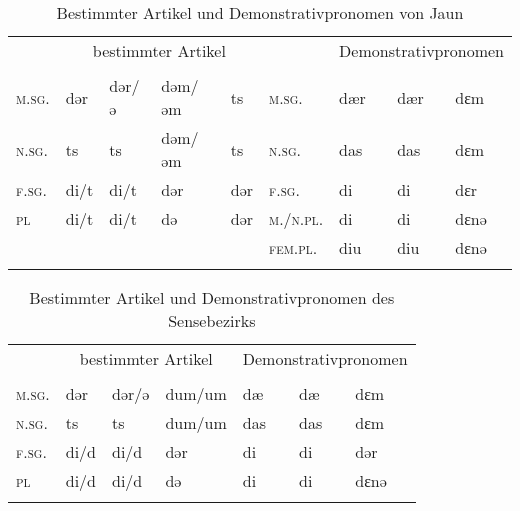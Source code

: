 \begin{table}[H]
	\caption{Bestimmter Artikel und Demonstrativpronomen von Jaun \citep[282-283]{Stucki1917}}\label{table86}
	\begin{tabular}{lllllllll}
		\lsptoprule
		& \multicolumn{4}{c}{bestimmter Artikel} &  & \multicolumn{3}{c}{Demonstrativpronomen}\\\cmidrule(lr){2-5}\cmidrule(lr){7-9}
		& \NOM & \AKK & \DAT & \GEN &  & \NOM & \AKK & \DAT\\\midrule
		\textsc{m.sg.} & dər & dər/ə & dəm/əm & ts & \textsc{m.sg.} & dær & dær & dɛm\\
		\textsc{n.sg.} & ts & ts & dəm/əm & ts & \textsc{n.sg.} & das & das & dɛm\\
		\textsc{f.sg.} & di/t & di/t & dər & dər & \textsc{f.sg.} & di & di & dɛr\\
		\textsc{pl} & di/t & di/t & də & dər & \textsc{m./n.pl.} & di & di & dɛnə\\
		&  &  &  &  & \textsc{fem.pl.} & diu & diu & dɛnə\\
		\lspbottomrule
	\end{tabular}
\end{table}


\begin{table}[H]
	\caption{Bestimmter Artikel und Demonstrativpronomen des Sensebezirks \citep[200-201]{Henzen1927}}\label{table87}
	\begin{tabular}{lllllll}
		\lsptoprule
		& \multicolumn{3}{c}{bestimmter Artikel} & \multicolumn{3}{c}{Demonstrativpronomen} \\\cmidrule(lr){2-4}\cmidrule(lr){5-7}
		& \NOM & \AKK & \DAT & \NOM & \AKK & \DAT\\\midrule
		\textsc{m.sg.} & dər & dər/ə & dum/um & dæ & dæ & dɛm\\
		\textsc{n.sg.} & ts & ts & dum/um & das & das & dɛm\\
		\textsc{f.sg.} & di/d & di/d & dər & di & di & dər\\
		\textsc{pl} & di/d & di/d & də & di & di & dɛnə\\
		\lspbottomrule
	\end{tabular}
\end{table}


